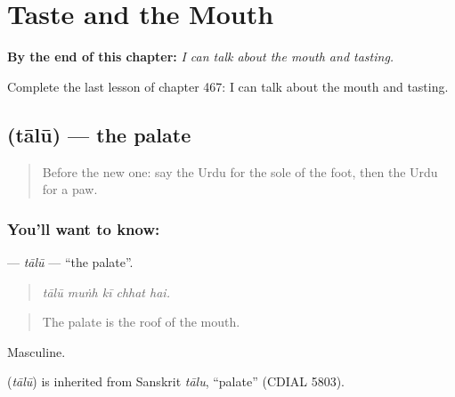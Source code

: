 
\chapter{Taste and the Mouth}
\label{ch:ur-taste-and-the-mouth}

\begin{chapteropening}
\textbf{By the end of this chapter:} \emph{I can talk about the mouth and tasting.}

Complete the last lesson of chapter 467: I can talk about the mouth and tasting.
\end{chapteropening}

\section[\texorpdfstring{\ur{تالو} (tālū)}{تالو (tālū)}]{ (tālū) — the palate}

\label{lesson:UR-C467-talu}



\begin{quote}
Before the new one: say the Urdu for the sole of the foot, then the Urdu for a paw.
\end{quote}

\subsection*{You'll want to know: }
\textbf{} — \emph{tālū} — \textquotedblleft{}the palate\textquotedblright{}.

\begin{quote}
    
\end{quote}

\begin{quote}
\emph{tālū muṅh kī chhat hai.}
\end{quote}

\begin{quote}
The palate is the roof of the mouth.
\end{quote}

Masculine.

\begin{cousinweb}
\textbf{} (\emph{tālū}) is inherited from Sanskrit \emph{tālu}, \textquotedblleft{}palate\textquotedblright{} (CDIAL 5803).
\end{cousinweb}

